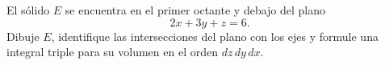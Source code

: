 El sólido $E$ se encuentra en el primer octante y debajo del plano
\[
2x+3y+z=6.
\]
Dibuje $E$, identifique las intersecciones del plano con los ejes y formule una integral triple para su volumen en el orden $dz\,dy\,dx$.

